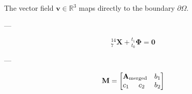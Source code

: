 \documentclass{article}
\begin{document}
The vector field $\mathbf{v} \in \mathbb{R}^3$ maps directly to the boundary \( \partial \Omega \).

---

\begin{equation}
{}_7^{14}\mathbf{X} + {}_{t_0}^{t_1}\mathbf{\Phi} = \mathbf{0}
\end{equation}

---

\begin{equation}
\mathbf{M} = \begin{bmatrix}
\multicolumn{2}{c}{\mathbf{A}_{\text{merged}}} & b_1 \\
c_1 & c_2 & b_2
\end{bmatrix}
\end{equation}
\end{document}
